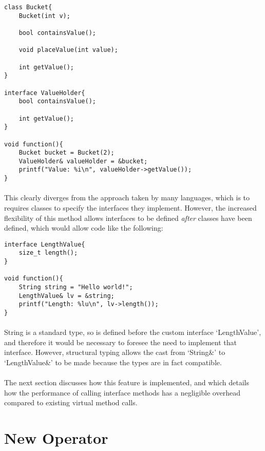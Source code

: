 \documentclass[12pt,twoside,notitlepage]{report}
\begin{document}
\small{
\begin{verbatim}
class Bucket{
    Bucket(int v);

    bool containsValue();
    
    void placeValue(int value);
    
    int getValue();
}

interface ValueHolder{
    bool containsValue();
    
    int getValue();
}

void function(){
    Bucket bucket = Bucket(2);
    ValueHolder& valueHolder = &bucket;
    printf("Value: %i\n", valueHolder->getValue());
}
\end{verbatim}
}

\paragraph{}
This clearly diverges from the approach taken by many languages, which is to requires classes to specify the interfaces they implement. However, the increased flexibility of this method allows interfaces to be defined \emph{after} classes have been defined, which would allow code like the following:

\small{
\begin{verbatim}
interface LengthValue{
    size_t length();
}

void function(){
    String string = "Hello world!";
    LengthValue& lv = &string;
    printf("Length: %lu\n", lv->length());
}
\end{verbatim}
}

\paragraph{}
String is a standard type, so is defined before the custom interface `LengthValue', and therefore it would be necessary to foresee the need to implement that interface. However, structural typing allows the cast from `String\&' to `LengthValue\&' to be made because the types are in fact compatible.

\paragraph{}
The next section discusses how this feature is implemented, and which details how the performance of calling interface methods has a negligible overhead compared to existing virtual method calls.

\section{New Operator}
\end{document}
